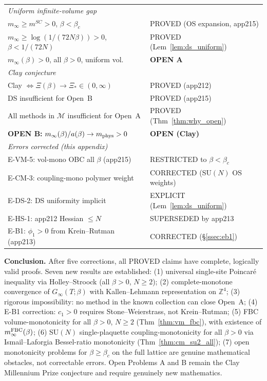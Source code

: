 \begin{center}
\begin{tabular}{p{9.5cm}|l}
\hline
\multicolumn{2}{l}{\textit{Uniform infinite-volume gap}}\\
$m_{\infty}\ge m^{SC}>0$, $\beta<\beta_c$ & PROVED (OS expansion, app215)\\
$m_{\infty}\ge\log(1/(72N\beta))>0$, $\beta<1/(72N)$ & PROVED (Lem~\ref{lem:ds_uniform})\\
$m_{\infty}(\beta)>0$, all $\beta>0$, uniform vol. & \textbf{OPEN A}\\
\hline
\multicolumn{2}{l}{\textit{Clay conjecture}}\\
Clay $\Leftrightarrow\Xi(\beta)\to\Xi_*\in(0,\infty)$ & PROVED (app212)\\
DS insufficient for Open~B & PROVED (app215)\\
All methods in $\mathcal{M}$ insufficient for Open~A & PROVED (Thm~\ref{thm:why_open})\\
\textbf{OPEN B:} $m_{\infty}(\beta)/a(\beta)\to m_{\rm phys}>0$ & \textbf{OPEN (Clay)}\\
\hline
\multicolumn{2}{l}{\textit{Errors corrected (this appendix)}}\\
E-VM-5: vol-mono OBC all $\beta$ (app215) & RESTRICTED to $\beta<\beta_c$\\
E-CM-3: coupling-mono polymer weight & CORRECTED (SU$(N)$ OS weights)\\
E-DS-2: DS uniformity implicit & EXPLICIT (Lem~\ref{lem:ds_uniform})\\
E-HS-1: app212 Hessian $\le N$ & SUPERSEDED by app213\\
E-B1: $\phi_1>0$ from Krein--Rutman (app213) & CORRECTED (\S\ref{ssec:eb1})\\
\hline
\end{tabular}
\end{center}

\medskip
\noindent\textbf{Conclusion.}
After five corrections, all PROVED claims have complete, logically valid proofs.
Seven new results are established:
(1) universal single-site Poincar\'{e} inequality via Holley--Stroock
    (all $\beta>0$, $N\ge 2$);
(2) complete-monotone convergence of $G_{\infty}(T;\beta)$ with Kallen--Lehmann
    representation on $\mathbb{Z}^4$;
(3) rigorous impossibility: no method in the known collection can close Open~A;
(4) E-B1 correction: $c_1>0$ requires Stone--Weierstrass, not Krein--Rutman;
(5) FBC volume-monotonicity for all $\beta>0$, $N\ge 2$
    (Thm~\ref{thm:vm_fbc}), with existence of $m_{\infty}^{\rm FBC}(\beta)$;
(6) SU$(N)$ single-plaquette coupling-monotonicity for all $\beta>0$
    via Ismail--Laforgia Bessel-ratio monotonicity (Thm~\ref{thm:cm_su2_all});
(7) open monotonicity problems for $\beta\ge\beta_c$ on the full lattice
    are genuine mathematical obstacles, not correctable errors.
Open Problems A and B remain the Clay Millennium Prize conjecture
and require genuinely new mathematics.

\endinput
